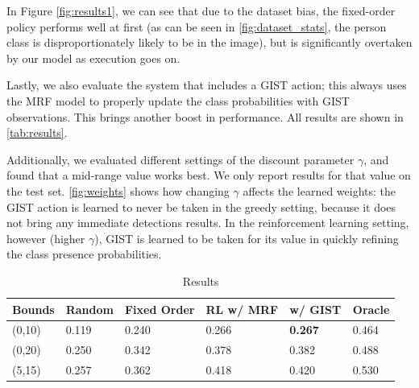 In Figure \autoref{fig:results1}, we can see that due to the dataset bias, the fixed-order policy performs well at first (as can be seen in \autoref{fig:dataset_stats}, the person class is disproportionately likely to be in the image), but is significantly overtaken by our model as execution goes on.

Lastly, we also evaluate the system that includes a GIST action; this always uses the MRF model to properly update the class probabilities with GIST observations.
This brings another boost in performance.
All results are shown in \autoref{tab:results}.

Additionally, we evaluated different settings of the discount parameter $\gamma$, and found that a mid-range value works best.
We only report results for that value on the test set.
\autoref{fig:weights} shows how changing $\gamma$ affects the learned weights: the GIST action is learned to never be taken in the greedy setting, because it does not bring any immediate detections results.
In the reinforcement learning setting, however (higher $\gamma$), GIST is learned to be taken for its value in quickly refining the class presence probabilities.

\begin{table}[t]
\caption{Results}
\label{tab:results}
\begin{center}
\begin{tabular}{|l|l|l|l|l|l|}
\hline
Bounds & Random & Fixed Order & RL w/ MRF & w/ GIST  & Oracle \\ \hline
(0,10) & 0.119  & 0.240       & 0.266     & \textbf{0.267}    & 0.464 \\ 
(0,20) & 0.250  & 0.342       & 0.378     & 0.382    & 0.488 \\ 
(5,15) & 0.257  & 0.362       & 0.418     & 0.420    & 0.530 \\ \hline
\end{tabular}
\end{center}
\end{table}

